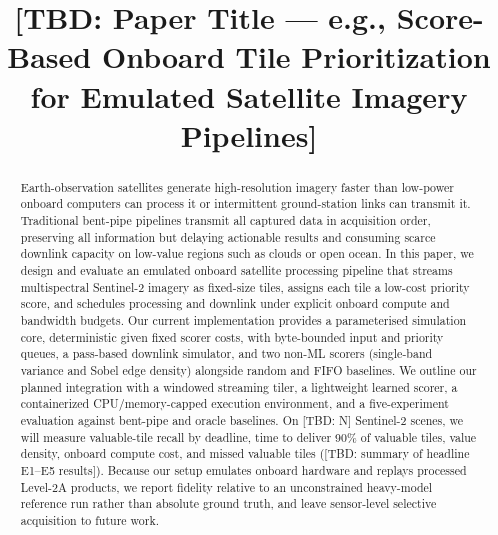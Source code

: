 \documentclass[conference]{IEEEtran}
\begin{document}
\title{[TBD: Paper Title --- e.g., Score-Based Onboard Tile Prioritization for Emulated Satellite Imagery Pipelines]}

\author{
}

\maketitle

\begin{abstract}
Earth-observation satellites generate high-resolution imagery faster than low-power onboard computers can process it or intermittent ground-station links can transmit it. Traditional bent-pipe pipelines transmit all captured data in acquisition order, preserving all information but delaying actionable results and consuming scarce downlink capacity on low-value regions such as clouds or open ocean. In this paper, we design and evaluate an emulated onboard satellite processing pipeline that streams multispectral Sentinel-2 imagery as fixed-size tiles, assigns each tile a low-cost priority score, and schedules processing and downlink under explicit onboard compute and bandwidth budgets. Our current implementation provides a parameterised simulation core, deterministic given fixed scorer costs, with byte-bounded input and priority queues, a pass-based downlink simulator, and two non-ML scorers (single-band variance and Sobel edge density) alongside random and FIFO baselines. We outline our planned integration with a windowed streaming tiler, a lightweight learned scorer, a containerized CPU/memory-capped execution environment, and a five-experiment evaluation against bent-pipe and oracle baselines. On [TBD: N] Sentinel-2 scenes, we will measure valuable-tile recall by deadline, time to deliver 90\% of valuable tiles, value density, onboard compute cost, and missed valuable tiles ([TBD: summary of headline E1--E5 results]). Because our setup emulates onboard hardware and replays processed Level-2A products, we report fidelity relative to an unconstrained heavy-model reference run rather than absolute ground truth, and leave sensor-level selective acquisition to future work.
\end{abstract}
\end{document}
